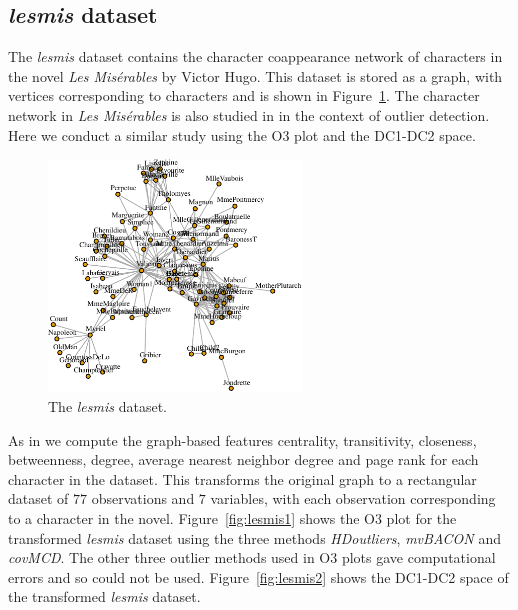 \documentclass[letter,12pt]{article}
\begin{document}
\subsection{\textit{lesmis} dataset}\label{sec:ResWithVis5}

The \textit{lesmis} dataset \citep{sombrero} contains the character coappearance network of characters in the novel \textit{Les Mis\'erables} by Victor Hugo. This dataset is stored as a graph, with vertices corresponding to characters and is shown in Figure~\ref{fig:lesmisgraph}. The character network in \textit{Les Mis\'erables} is also studied in \cite{wilkinson2017visualizing} in the context of outlier detection. Here we conduct a similar study using the O3 plot and the DC1-DC2 space.

\begin{figure}[!ht]
	\centering
	\includegraphics[width=0.6\textwidth]{lesmis.pdf}
	\caption{The \textit{lesmis} dataset.}
	\label{fig:lesmisgraph}
\end{figure}

As in \cite{wilkinson2017visualizing} we compute the graph-based features centrality, transitivity, closeness, betweenness, degree, average nearest neighbor degree and page rank for each character in the dataset. This transforms the original graph to a rectangular dataset of $77$ observations and $7$ variables, with each observation corresponding to a character in the novel. Figure~\ref{fig:lesmis1} shows the O3 plot for the transformed \textit{lesmis} dataset using the three methods \textit{HDoutliers}, \textit{mvBACON} and \textit{covMCD}. The other three outlier methods used in O3 plots gave computational errors and so could not be used. Figure~\ref{fig:lesmis2} shows the DC1-DC2 space of the transformed \textit{lesmis} dataset.
\end{document}

